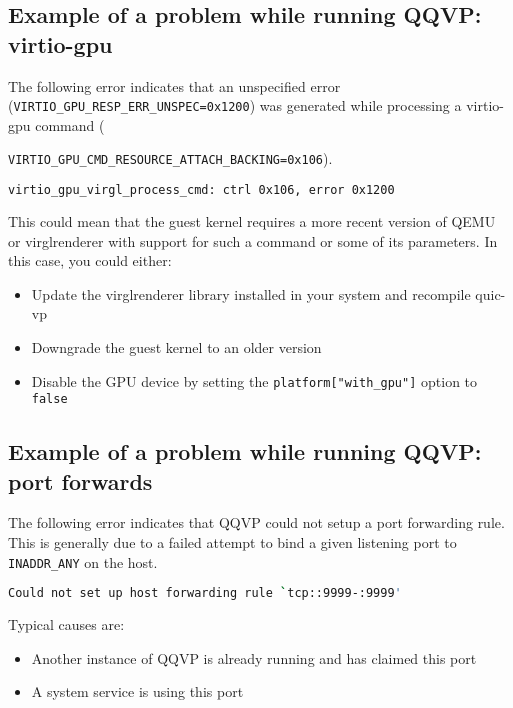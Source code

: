 \subsection{Example of a problem while running QQVP: virtio-gpu}
\label{sec:virtioGPU}

The following error indicates that an unspecified error ({\small{\lstinline!VIRTIO_GPU_RESP_ERR_UNSPEC=0x1200!}})
was generated while processing a virtio-gpu command ({\mbox{{\small{\lstinline!VIRTIO_GPU_CMD_RESOURCE_ATTACH_BACKING=0x106!}}}).

\small
\begin{lstlisting}[language=bash]
    virtio_gpu_virgl_process_cmd: ctrl 0x106, error 0x1200
\end{lstlisting}
\normalsize

This could mean that the guest kernel requires a more recent version of QEMU or
virglrenderer with support for such a command or some of its parameters.
In this case, you could either:

\begin{itemize}
\item Update the virglrenderer library installed in your system and recompile quic-vp
\item Downgrade the guest kernel to an older version
\item Disable the GPU device by setting the {\small{\lstinline!platform["with_gpu"]!}} option to {\small{\lstinline!false!}}
\end{itemize}

\clearpage
\subsection{Example of a problem while running QQVP: port forwards}
\label{sec:portForwards}

The following error indicates that QQVP could not setup a port forwarding
rule. This is generally due to a failed attempt to bind a given listening port
to {\small{\lstinline!INADDR_ANY!}} on the host.

\small
\begin{lstlisting}[language=bash]
    Could not set up host forwarding rule `tcp::9999-:9999'
\end{lstlisting}
\normalsize

Typical causes are:
\begin{itemize}
\item Another instance of QQVP is already running and has claimed this port
\item A system service is using this port
\end{itemize}

}
